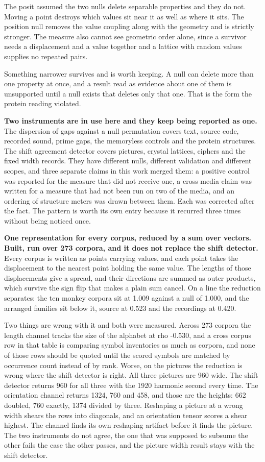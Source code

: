 The posit assumed the two nulls delete separable properties and they do not. Moving a point destroys which values sit near it as well as where it sits. The position null removes the value coupling along with the geometry and is strictly stronger. The measure also cannot see geometric order alone, since a survivor needs a displacement and a value together and a lattice with random values supplies no repeated pairs.

Something narrower survives and is worth keeping. A null can delete more than one property at once, and a result read as evidence about one of them is unsupported until a null exists that deletes only that one. That is the form the protein reading violated.

\textbf{Two instruments are in use here and they keep being reported as one.} The dispersion of gaps against a null permutation covers text, source code, recorded sound, prime gaps, the memoryless controls and the protein structures. The shift agreement detector covers pictures, crystal lattices, ciphers and the fixed width records. They have different nulls, different validation and different scopes, and three separate claims in this work merged them: a positive control was reported for the measure that did not receive one, a cross media claim was written for a measure that had not been run on two of the media, and an ordering of structure meters was drawn between them. Each was corrected after the fact. The pattern is worth its own entry because it recurred three times without being noticed once.

\textbf{One representation for every corpus, reduced by a sum over vectors. Built, run over 273 corpora, and it does not replace the shift detector.} Every corpus is written as points carrying values, and each point takes the displacement to the nearest point holding the same value. The lengths of those displacements give a spread, and their directions are summed as outer products, which survive the sign flip that makes a plain sum cancel. On a line the reduction separates: the ten monkey corpora sit at 1.009 against a null of 1.000, and the arranged families sit below it, source at 0.523 and the recordings at 0.420.

Two things are wrong with it and both were measured. Across 273 corpora the length channel tracks the size of the alphabet at rho -0.530, and a cross corpus row in that table is comparing symbol inventories as much as corpora, and none of those rows should be quoted until the scored symbols are matched by occurrence count instead of by rank. Worse, on the pictures the reduction is wrong where the shift detector is right. All three pictures are 960 wide. The shift detector returns 960 for all three with the 1920 harmonic second every time. The orientation channel returns 1324, 760 and 458, and those are the heights: 662 doubled, 760 exactly, 1374 divided by three. Reshaping a picture at a wrong width shears the rows into diagonals, and an orientation tensor scores a shear highest. The channel finds its own reshaping artifact before it finds the picture. The two instruments do not agree, the one that was supposed to subsume the other fails the case the other passes, and the picture width result stays with the shift detector.


